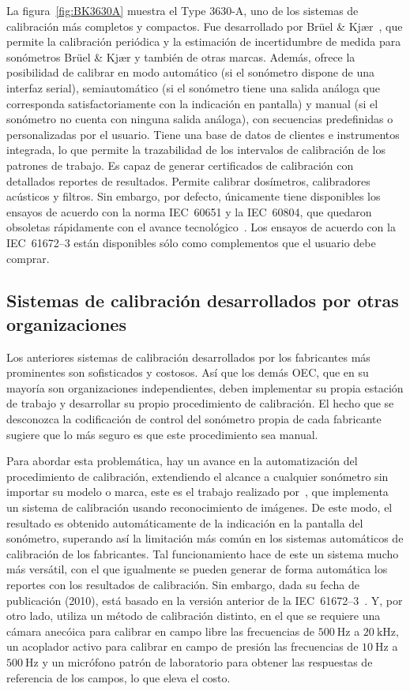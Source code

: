 La figura~\ref{fig:BK3630A} muestra el Type 3630-A, uno de los sistemas de calibración más completos y compactos.
Fue desarrollado por Brüel \& Kjær~\citeyearpar{BruelKjaer2000}, que permite la calibración periódica y la estimación
de incertidumbre de medida para sonómetros Brüel \& Kjær y también de otras marcas.
Además, ofrece la posibilidad de calibrar en modo automático (si el sonómetro dispone de una interfaz serial),
semiautomático (si el sonómetro tiene una salida análoga que corresponda satisfactoriamente con la indicación en
pantalla) y manual (si el sonómetro no cuenta con ninguna salida análoga), con secuencias predefinidas o personalizadas
por el usuario.
Tiene una base de datos de clientes e instrumentos integrada, lo que permite la trazabilidad de los intervalos de
calibración de los patrones de trabajo.
Es capaz de generar certificados de calibración con detallados reportes de resultados.
Permite calibrar dosímetros, calibradores acústicos y filtros.
Sin embargo, por defecto, únicamente tiene disponibles los ensayos de acuerdo con la norma \mbox{IEC 60651} y la
\mbox{IEC 60804}, que quedaron obsoletas rápidamente con el avance tecnológico~\citep{Beyers2014}.
Los ensayos de acuerdo con la \mbox{IEC 61672--3} están disponibles sólo como complementos que el usuario debe comprar.

\subsection{Sistemas de calibración desarrollados por otras organizaciones}
Los anteriores sistemas de calibración desarrollados por los fabricantes más prominentes son sofisticados y costosos.
Así que los demás OEC, que en su mayoría son organizaciones independientes, deben implementar su propia estación de
trabajo y desarrollar su propio procedimiento de calibración.
El hecho que se desconozca la codificación de control del sonómetro propia de cada fabricante sugiere que lo más seguro
es que este procedimiento sea manual.

Para abordar esta problemática, hay un avance en la automatización del procedimiento de calibración, extendiendo el
alcance a cualquier sonómetro sin importar su modelo o marca, este es el trabajo realizado por~\cite{Zhong2010},
que implementa un sistema de calibración usando reconocimiento de imágenes.
De este modo, el resultado es obtenido automáticamente de la indicación en la pantalla del sonómetro, superando así la
limitación más común en los sistemas automáticos de calibración de los fabricantes.
Tal funcionamiento hace de este un sistema mucho más versátil, con el que igualmente se pueden generar de forma
automática los reportes con los resultados de calibración.
Sin embargo, dada su fecha de publicación (2010), está basado en la versión anterior de la
\mbox{IEC 61672--3}~\citeyearpar{IEC_TC29_2013_3}.
Y, por otro lado, utiliza un método de calibración distinto, en el que se requiere una cámara anecóica para calibrar en
campo libre las frecuencias de $\qty{500}{\Hz}$ a $\qty{20}{\kHz}$, un acoplador activo para calibrar en campo de
presión las frecuencias de $\qty{10}{\Hz}$ a $\qty{500}{\Hz}$ y un micrófono patrón de laboratorio para obtener las
respuestas de referencia de los campos, lo que eleva el costo.

